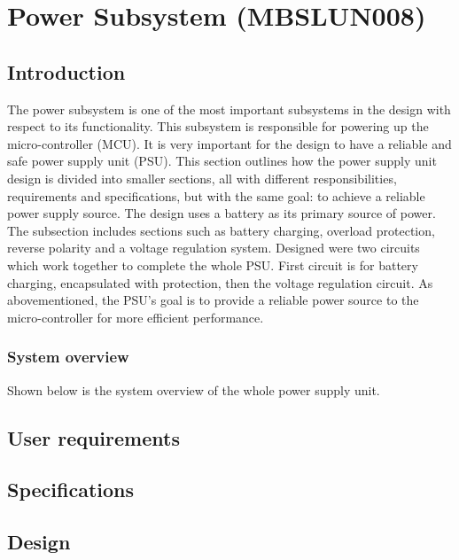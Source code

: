 \documentclass[class=report,11pt,crop=false]{standalone}
\begin{document}
	\chapter{Power Subsystem (MBSLUN008)}
	\vspace{0.5cm}
	\section{Introduction}
	The power subsystem is one of the most important subsystems in the design with respect to its functionality. This subsystem is responsible for powering up the micro-controller (MCU). It is very important for the design to have a reliable and safe power supply unit (PSU). This section outlines how the power supply unit design is divided into smaller sections, all with different responsibilities, requirements and specifications, but with the same goal: to achieve a reliable power supply source. The design uses a battery as its primary source of power. The subsection includes sections such as battery charging, overload protection, reverse polarity and a voltage regulation system. Designed were two circuits which work together to complete the whole PSU. First circuit is for battery charging, encapsulated with protection, then the voltage regulation circuit. As abovementioned, the PSU's goal is to provide a reliable power source to the micro-controller for more efficient performance. 
	
	\subsection{System overview}
	
	Shown below is the system overview of the whole power supply unit. 
	
	\section{User requirements}
	\section{Specifications}
	
	\section{Design}
\end{document}
